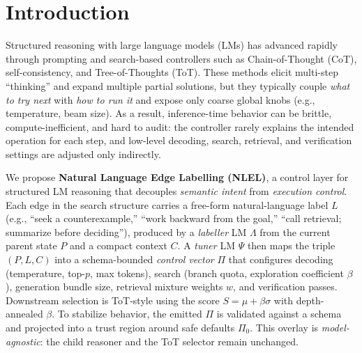 \documentclass{article}
\theoremstyle{plain}
\theoremstyle{definition}
\theoremstyle{remark}
\begin{document}

\printAffiliationsAndNotice{}

\begin{abstract}
\end{abstract}

\section{Introduction}

Structured reasoning with large language models (LMs) has advanced rapidly through prompting and search-based controllers such as Chain-of-Thought (CoT), self-consistency, and Tree-of-Thoughts (ToT). These methods elicit multi-step ``thinking'' and expand multiple partial solutions, but they typically couple \emph{what to try next} with \emph{how to run it} and expose only coarse global knobs (e.g., temperature, beam size). As a result, inference-time behavior can be brittle, compute-inefficient, and hard to audit: the controller rarely explains the intended operation for each step, and low-level decoding, search, retrieval, and verification settings are adjusted only indirectly.

We propose \textbf{Natural Language Edge Labelling (NLEL)}, a control layer for structured LM reasoning that decouples \emph{semantic intent} from \emph{execution control}. Each edge in the search structure carries a free-form natural-language label $L$ (e.g., ``seek a counterexample,'' ``work backward from the goal,'' ``call retrieval; summarize before deciding''), produced by a \emph{labeller} LM \(\Lambda\) from the current parent state \(P\) and a compact context \(C\). A \emph{tuner} LM \(\Psi\) then maps the triple \((P,L,C)\) into a schema-bounded \emph{control vector} \(\Pi\) that configures decoding (temperature, top-\(p\), max tokens), search (branch quota, exploration coefficient \(\beta\)), generation bundle size, retrieval mixture weights \(w\), and verification passes. Downstream selection is ToT-style using the score \(S=\mu+\beta\sigma\) with depth-annealed \(\beta\). To stabilize behavior, the emitted \(\Pi\) is validated against a schema and projected into a trust region around safe defaults \(\Pi_{0}\). This overlay is \emph{model-agnostic}: the child reasoner and the ToT selector remain unchanged.
\end{document}
